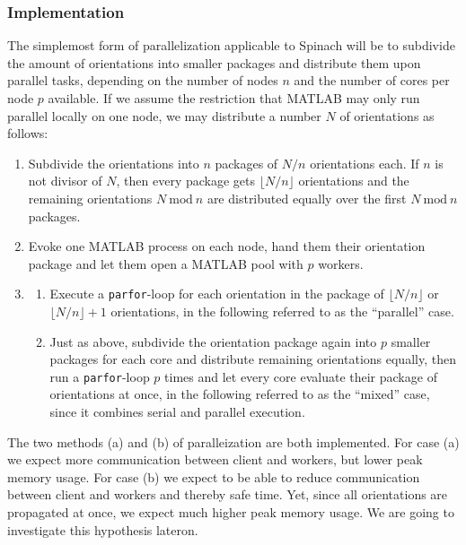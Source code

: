 \documentclass[11.5pt,a4paper]{article}
\begin{document}
\subsubsection{Implementation}
The simplemost form of parallelization applicable to Spinach will be to subdivide the amount of orientations into smaller packages and distribute them upon parallel tasks, depending on the number of nodes $n$ and the number of cores per node $p$ available. If we assume the restriction that MATLAB may only run parallel locally on one node, we may distribute a number $N$ of orientations as follows:
\begin{enumerate}
 \item Subdivide the orientations into $n$ packages of $N/n$ orientations each. If $n$ is not divisor of $N$, then every package gets $\lfloor N/n \rfloor$ orientations and the remaining orientations $N\ \text{mod}\ n$ are distributed equally over the first $N\ \text{mod}\ n$ packages.
 \item Evoke one MATLAB process on each node, hand them their orientation package and let them open a MATLAB pool with $p$ workers.
 \item { \begin{enumerate}
          \item Execute a \verb$parfor$-loop for each orientation in the package of $\lfloor N/n \rfloor$ or $\lfloor N/n \rfloor + 1$ orientations, in the following referred to as the ``parallel'' case. 
	  \item Just as above, subdivide the orientation package again into $p$ smaller packages for each core and distribute remaining orientations equally, then run a \verb$parfor$-loop $p$ times and let every core evaluate their package of orientations at once, in the following referred to as the ``mixed'' case, since it combines serial and parallel execution.
         \end{enumerate} }
\end{enumerate}

The two methods (a) and (b) of paralleization are both implemented. For case (a) we expect more communication between client and workers, but lower peak memory usage. For case (b) we expect to be able to reduce communication between client and workers and thereby safe time. Yet, since all orientations are propagated at once, we expect much higher peak memory usage. We are going to investigate this hypothesis lateron.
\end{document}
